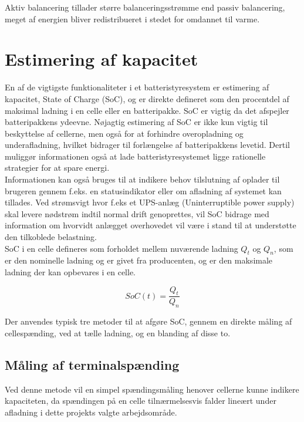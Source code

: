 Aktiv balancering tillader større balanceringsstrømme end passiv balancering, meget af energien bliver redistribueret i stedet for omdannet til varme. 





\section{Estimering af kapacitet}
En af de vigtigste funktionaliteter i et batteristyresystem er estimering af kapacitet, State of Charge (SoC), og er direkte defineret som den procentdel af maksimal ladning i en celle eller en batteripakke. SoC er vigtig da det afspejler batteripakkens ydeevne. Nøjagtig estimering af SoC er ikke kun vigtig til beskyttelse af cellerne, men også for at forhindre overopladning og underafladning, hvilket bidrager til forlængelse af batteripakkens levetid. Dertil muliggør informationen også at lade batteristyresystemet ligge rationelle strategier for at spare energi.
\\
Informationen kan også bruges til at indikere behov tilslutning af oplader til brugeren gennem f.eks. en statusindikator eller om afladning af systemet kan tillades. 
Ved strømsvigt hvor f.eks et UPS-anlæg (Uninterruptible power supply) skal levere nødstrøm indtil normal drift genoprettes, vil SoC bidrage med information om hvorvidt anlægget overhovedet vil være i stand til at understøtte den tilkoblede belastning.
\\

SoC i en celle defineres som forholdet mellem nuværende ladning $Q_{t}$ og $Q_{n}$, som er den nominelle ladning og er givet fra producenten, og er den maksimale ladning der kan opbevares i en celle.

\begin {equation} 
SoC(t) = \frac{Q_t}{Q_n} \label{eq:soc}
\end {equation}

Der anvendes typisk tre metoder til at afgøre SoC, gennem en direkte måling af cellespænding, ved at tælle ladning, og en blanding af disse to.






\subsection{Måling af terminalspænding}
Ved denne metode vil en simpel spændingsmåling henover cellerne kunne indikere kapaciteten, da spændingen på en celle tilnærmelsesvis falder lineært under afladning i dette projekts valgte arbejdsområde.








